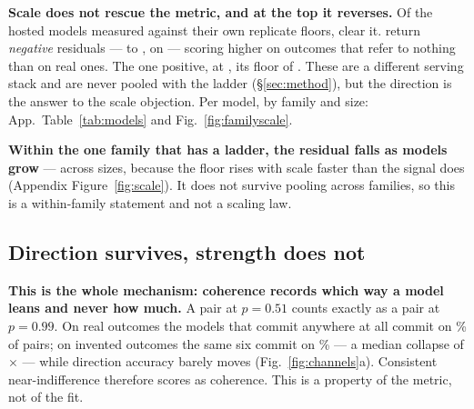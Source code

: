 \documentclass[11pt,a4paper]{article}
\newcommand{\armR}{\textbf{R}}
\newcommand{\armNp}{\textbf{N\textsuperscript{+}}}
\newcommand{\armNm}{\textbf{N\textsuperscript{--}}}
\begin{document}
\textbf{Scale does not rescue the metric, and at the top it reverses.} Of the
\NHosted{} hosted models measured against their own replicate floors,
\HostedNClearingFloor{} clear it. \HostedNNegative{} return \emph{negative}
residuals --- \HostedMostNegative{} to \HostedLeastNegative{}, on
\HostedNegativeModels{} --- scoring higher on outcomes that refer to nothing
than on real ones. The one positive, \LadderHosted{} at \HostedResidual{},
\HostedClears{} its floor of \HostedFloor{}. These are a different serving
stack and are never pooled with the ladder (\S\ref{sec:method}), but the
direction is the answer to the scale objection. Per model, by family and size:
App.~Table~\ref{tab:models} and Fig.~\ref{fig:familyscale}.

\textbf{Within the one family that has a ladder, the residual falls as models
grow} --- \LadderResidFall{} across \LadderNSizes{} sizes, because the floor
rises with scale faster than the signal does (Appendix
Figure~\ref{fig:scale}). It does not survive pooling across families, so this is
a within-family statement and not a scaling law.

\begin{table}[htbp]
\centering
\caption{\textbf{Per-model results against each model's own noise floor.}
\armR{}, \armNp{}, \armNm{} are held-out accuracy on real outcomes, invented
outcomes with magnitudes kept, and invented outcomes with magnitudes removed,
over \NSplits{} splits and \NDesignReps{} design replicates. \textbf{floor} is
the spread of the same cell across those replicates; \textbf{clears} reports
whether the residual exceeds it and by what factor. $^{*}$ marks a floor too
near zero for a ratio to mean anything; $^{\dagger}$ marks a model decisive on
under \FlatDecisiveThreshPct\% of pairs on both arms. \textbf{dec.} is the share
of pairs at $p<0.2$ or $p>0.8$. Full model ids in
Appendix~\ref{app:tables}.}
\label{tab:main}
\footnotesize
\setlength{\tabcolsep}{4.5pt}

\end{table}

\subsection{Direction survives, strength does not}\label{sec:mech}

\textbf{This is the whole mechanism: coherence records which way a model leans
and never how much.} A pair at $p = 0.51$ counts exactly as a pair at
$p = 0.99$. On real outcomes the \NDecisiveModels{} models that commit anywhere
at all commit on \MeanDecisiveR\% of pairs; on invented outcomes the same six
commit on \MeanDecisiveN\% --- a median collapse of
\MedianDecisiveRatio$\times$ --- while direction accuracy barely moves
(Fig.~\ref{fig:channels}a). Consistent near-indifference therefore scores as
coherence. This is a property of the metric, not of the fit.
\end{document}
